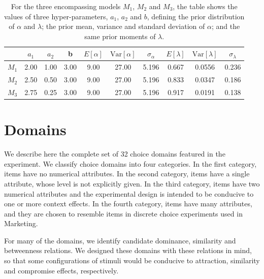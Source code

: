 \documentclass[11pt,letter]{article}
\begin{document}
\begin{table}
  \centering
  \begin{tabular}{cccccccccc}
    & $a_1$ & $a_2$ & b &
    $E[\alpha]$ & $\mathrm{Var}[\alpha]$ & $\sigma_\alpha$ & $E[\lambda]$ & $\mathrm{Var}[\lambda]$ & $\sigma_\lambda$ \\
    \hline
    $M_1$ & 2.00 & 1.00 & 3.00 & 9.00 & 27.00 & 5.196 & 0.667 & 0.0556 & 0.236 \\
    $M_2$ & 2.50 & 0.50 & 3.00 & 9.00 & 27.00 & 5.196 & 0.833 & 0.0347 & 0.186 \\
    $M_3$ & 2.75 & 0.25 & 3.00 & 9.00 & 27.00 & 5.196 & 0.917 & 0.0191 & 0.138 \\
    \hline
  \end{tabular}\caption{For the three encompassing models $M_1$, $M_2$ and $M_3$, the table shows the values of three hyper-parameters, $a_1$, $a_2$ and $b$, defining the prior distribution of $\alpha$ and $\lambda$; the prior mean, variance and standard deviation of $\alpha$; and the same prior moments of $\lambda$.}\label{t:hyper}
\end{table}


\section{Domains}\label{s:domains}

We describe here the complete set of 32 choice domains featured in the experiment.
We classify choice domains into four categories.
In the first category, items have no numerical attributes.
In the second category, items have a single attribute, whose level is not explicitly given.
In the third category, items have two numerical attributes and the experimental design is intended to be conducive to one or more context effects.
In the fourth category, items have many attributes, and they are chosen to resemble items in discrete choice experiments used in Marketing.

For many of the domains, we identify candidate dominance, similarity and betweenness relations.
We designed these domains with these relations in mind, so that some configurations of stimuli would be conducive to attraction, similarity and compromise effects, respectively.
\end{document}
